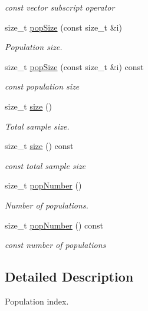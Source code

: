\begin{DoxyCompactItemize}
\begin{DoxyCompactList}\small\item\em {\ttfamily const} vector subscript operator \end{DoxyCompactList}\item 
size\+\_\+t \hyperlink{classsamp_files_1_1_pop_index_a5a58b623938c025a287711de86a4021a}{pop\+Size} (const size\+\_\+t \&i)
\begin{DoxyCompactList}\small\item\em Population size. \end{DoxyCompactList}\item 
size\+\_\+t \hyperlink{classsamp_files_1_1_pop_index_aef299f007e2123b430d6d36fa50d4d16}{pop\+Size} (const size\+\_\+t \&i) const
\begin{DoxyCompactList}\small\item\em {\ttfamily const} population size \end{DoxyCompactList}\item 
size\+\_\+t \hyperlink{classsamp_files_1_1_pop_index_a1de6bf81252ebc9d7d2521f62487b042}{size} ()
\begin{DoxyCompactList}\small\item\em Total sample size. \end{DoxyCompactList}\item 
size\+\_\+t \hyperlink{classsamp_files_1_1_pop_index_a251a3004894d15691b6f12adb84b0ad5}{size} () const
\begin{DoxyCompactList}\small\item\em {\ttfamily const} total sample size \end{DoxyCompactList}\item 
size\+\_\+t \hyperlink{classsamp_files_1_1_pop_index_ae478775b725c4cbae2be5b136c6e6856}{pop\+Number} ()
\begin{DoxyCompactList}\small\item\em Number of populations. \end{DoxyCompactList}\item 
size\+\_\+t \hyperlink{classsamp_files_1_1_pop_index_a6dde50396274681751d41b058af376d7}{pop\+Number} () const
\begin{DoxyCompactList}\small\item\em {\ttfamily const} number of populations \end{DoxyCompactList}\end{DoxyCompactItemize}


\subsection{Detailed Description}
Population index. 

